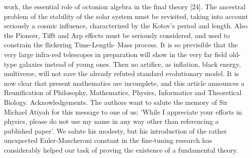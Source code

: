 work, the essential role of octonion algebra in the final theory [24].
The ancestral problem of the stability of the solar system must be revisited, taking into account
seriously a cosmic influence, characterized by the Kotov's period and length. Also the Pioneer, Tifft
and Arp effects must be seriously considered, and used to constrain the flickering Time-Length-
Mass process.
It is so previsible that the very large infra-red telescopes in preparation will show in the very far
field old-type galaxies instead of young ones. Then no artifice, as inflation, black energy,
multiverse, will not save the already refuted standard evolutionary model.
It is now clear that present mathematics are incomplete, and this article announces a
Reunification of Philosophy, Mathematics, Physics, Informatics and Theoretical Biology.
Acknowledgements. The authors want to salute the memory of Sir Michael Atiyah for this message
to one of us; 'While I appreciate your efforts in physics, please do not use my name in any way
other than referencing a published paper'. We salute his modesty, but his introduction of the rather
unexpected Euler-Mascheroni constant in the fine-tuning research has considerably helped our task
of proving the existence of a fundamental theory.
